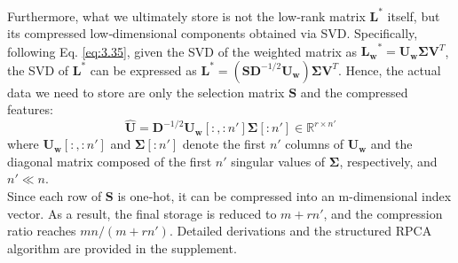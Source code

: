 \documentclass[runningheads]{llncs}
\begin{document}

Furthermore, what we ultimately store is not the low‑rank matrix $\mathbf{L}^*$ itself, but its compressed low‑dimensional components obtained via SVD. Specifically, following Eq. \eqref{eq:3.35}, given the SVD of the weighted matrix as $\mathbf{L_w}^* = \mathbf{U_w} \mathbf{\Sigma} \mathbf{V}^T$, the SVD of $\mathbf{L}^*$ can be expressed as $\mathbf{L}^* = (\mathbf{S} \mathbf{D}^{-1/2} \mathbf{U_w}) \mathbf{\Sigma} \mathbf{V}^T$. Hence, the actual data we need to store are only the selection matrix $\mathbf{S}$ and the compressed features:
\begin{equation}
    \hat{\mathbf{U}} = \mathbf{D}^{-1/2} \mathbf{U_w}[:,:n'] \mathbf{\Sigma}[:n'] \in \mathbb{R}^{r \times n'}
     \label{eq:3.310}
\end{equation}
where $\mathbf{U_w}[:,:n']$ and $\mathbf{\Sigma}[:n']$ denote the first $n'$ columns of $\mathbf{U_w}$ and the diagonal matrix composed of the first $n'$ singular values of $\mathbf{\Sigma}$, respectively, and $n' \ll n$. \\
Since each row of $\mathbf{S}$ is one‑hot, it can be compressed into an m-dimensional index vector. As a result, the final storage is reduced to $m + rn'$, and the compression ratio reaches $mn / (m + rn')$.
Detailed derivations and the structured RPCA algorithm are provided in the supplement.
\end{document}
